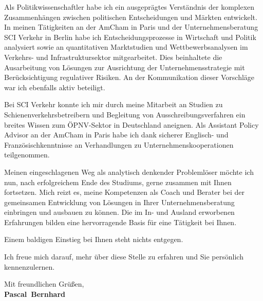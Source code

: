 \documentclass[11pt,a4paper]{article}
\def\firstname{Pascal}
\def\familyname{Bernhard}
\begin{document}
\vspace{5cm}

Als Politikwissenschaftler habe ich ein ausgeprägtes Verständnis der komplexen Zusammenhängen zwischen politischen Entscheidungen und Märkten entwickelt. In meinen Tätigkeiten an der AmCham in Paris und der Unternehmensberatung SCI Verkehr in Berlin habe ich Entscheidungsprozesse in Wirtschaft und Politik analysiert sowie an quantitativen Marktstudien und Wettbewerbsanalysen im Verkehrs- und Infrastruktursektor mitgearbeitet. Dies beinhaltete die Ausarbeitung von Lösungen zur Ausrichtung der Unternehmensstrategie mit Berücksichtigung regulativer Risiken. An der Kommunikation dieser Vorschläge war ich ebenfalls aktiv beteiligt.

Bei SCI Verkehr konnte ich mir durch meine Mitarbeit an Studien zu Schienenverkehrsbetreibern und Begleitung von Ausschreibungsverfahren ein breites Wissen zum ÖPNV-Sektor in Deutschland aneignen. Als Assistant Policy Advisor an der AmCham in Paris habe ich dank sicherer Englisch- und Französischkenntnisse an Verhandlungen zu Unternehmenskooperationen teilgenommen.

Meinen eingeschlagenen Weg als analytisch denkender Problemlöser möchte ich nun, nach erfolgreichem Ende des Studiums, gerne zusammen mit Ihnen fortsetzen. Mich reizt es, meine Kompetenzen als Coach und Berater bei der gemeinsamen Entwicklung von Lösungen in Ihrer Unternehmensberatung einbringen und ausbauen zu können. Die im In- und Ausland erworbenen Erfahrungen bilden eine hervorragende Basis für eine Tätigkeit bei Ihnen.


Einem baldigen Einstieg bei Ihnen steht nichts entgegen.

Ich freue mich darauf, mehr über diese Stelle zu erfahren und Sie persönlich kennenzulernen.

  
Mit freundlichen Grüßen,\\[3em] %
%
{\bfseries \firstname~\familyname}\\
%
\end{document}
